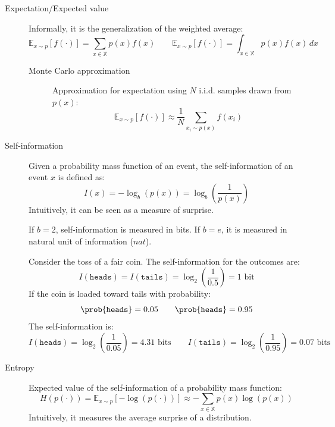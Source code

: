 \begin{description}
    \item[Expectation/Expected value] 
        Informally, it is the generalization of the weighted average:
        \[ 
            \mathbb{E}_{x \sim p}[ f(\cdot) ] = \sum_{x \in \mathbb{X}} p(x) f(x) 
            \qquad
            \mathbb{E}_{x \sim p}[ f(\cdot) ] = \int_{x \in \mathbb{X}} p(x) f(x) \,dx
        \]

        \begin{description}
            \item[Monte Carlo approximation] 
                Approximation for expectation using $N$ i.i.d. samples drawn from $p(x)$:
                \[ \mathbb{E}_{x \sim p}[f(\cdot)] \approx \frac{1}{N} \sum_{x_i \sim p(x)} f(x_i) \]
        \end{description}

    \item[Self-information] 
        Given a probability mass function of an event, the self-information of an event $x$ is defined as:
        \[ I(x) = -\log_b(p(x)) = \log_b\left( \frac{1}{p(x)} \right) \]
        Intuitively, it can be seen as a measure of surprise.

        \begin{remark}
            If $b = 2$, self-information is measured in bits. If $b = e$, it is measured in natural unit of information ($nat$).
        \end{remark}

        \begin{example}
            Consider the toss of a fair coin. The self-information for the outcomes are:
            \[ I(\texttt{heads}) = I(\texttt{tails}) = \log_2\left( \frac{1}{0.5} \right) = 1 \text{ bit} \]
            If the coin is loaded toward tails with probability:
            \[ 
                \prob{\texttt{heads}} = 0.05 
                \qquad 
                \prob{\texttt{heads}} = 0.95 
            \]
            The self-information is:
            \[ 
                I(\texttt{heads}) = \log_2\left( \frac{1}{0.05} \right) = 4.31 \text{ bits}
                \qquad
                I(\texttt{tails}) = \log_2\left( \frac{1}{0.95} \right) = 0.07 \text{ bits}
            \]
        \end{example}

    \item[Entropy] 
        Expected value of the self-information of a probability mass function:
        \[ H(p(\cdot)) = \mathbb{E}_{x \sim p} \left[ - \log(p(\cdot)) \right] \approx -\sum_{x \in \mathbb{X}} p(x) \log(p(x)) \]
        Intuitively, it measures the average surprise of a distribution.
        

\end{description}
